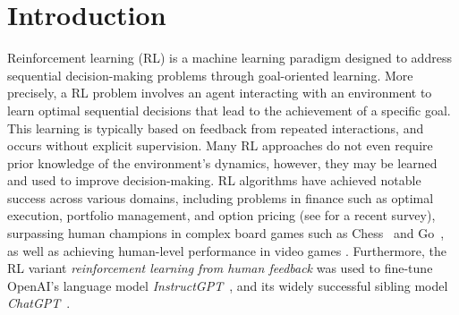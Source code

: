 \documentclass[
    a4paper,
    11pt,
    bibliography=totoc,
    listof=totoc,      
    headinclude=true,
    cleardoublepage=empty,
]{scrbook}
\theoremstyle{plain}
\theoremstyle{definition}
\theoremstyle{remark}
\begin{document}
\tableofcontents
\clearpage
{}


\chapter{Introduction} 
\label{chapter:Introduction}


Reinforcement learning (RL) is a machine learning paradigm designed to address 
sequential decision-making problems through goal-oriented learning. More 
precisely, a RL problem involves an agent interacting with an environment to 
learn optimal sequential decisions that lead to the achievement of a specific 
goal. This learning is typically based on feedback from repeated interactions, 
and occurs without explicit supervision. Many RL approaches do not even require 
prior knowledge of the environment's dynamics, however, they may be learned 
and used to improve decision-making. RL algorithms have achieved notable 
success across various domains, including problems in finance such as optimal 
execution, portfolio management, and option pricing (see 
\cite{hambly2022_rarl} for a recent survey),
surpassing human champions in complex board games such as 
Chess~\cite{silver2018_grlatmcsts} and Go~\cite{silver2017_mgwhk}, as well as 
achieving human-level performance in video games 
\cite{mnih2015_hctdrl,vinyals2019_glsumrl}. Furthermore, the RL variant 
\textit{reinforcement learning from human feedback} was used to fine-tune 
OpenAI's language model \textit{InstructGPT}~\cite{ouyang2022_tlmfiwhf}, and 
its widely successful sibling model \textit{ChatGPT}~\cite{openai2022_chatgpt}.
\end{document}
